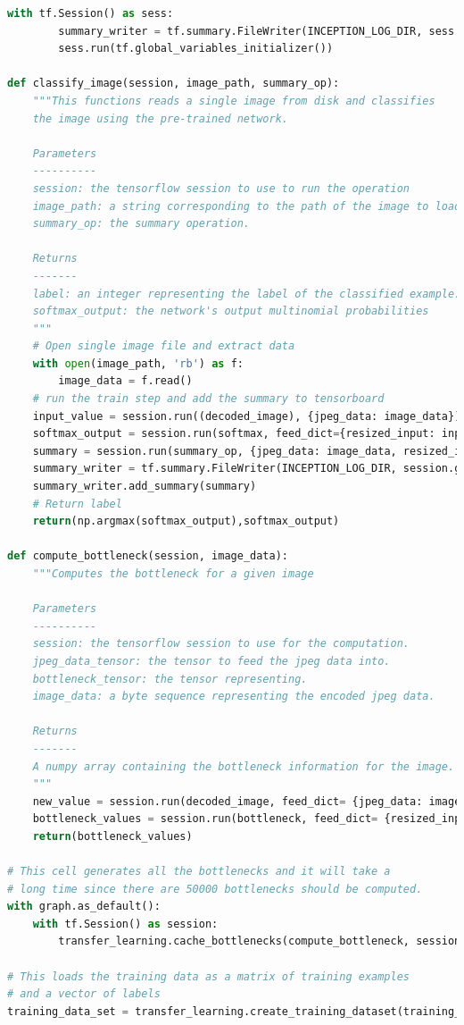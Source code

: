 \documentclass[hyperref]{article}
\theoremstyle{nonumberplain}
\begin{document}
\begin{appendices}
\begin{lstlisting}[language=Python]
    with tf.Session() as sess:
        summary_writer = tf.summary.FileWriter(INCEPTION_LOG_DIR, sess.graph)
        sess.run(tf.global_variables_initializer())

def classify_image(session, image_path, summary_op):
    """This functions reads a single image from disk and classifies
    the image using the pre-trained network.

    Parameters
    ----------
    session: the tensorflow session to use to run the operation
    image_path: a string corresponding to the path of the image to load
    summary_op: the summary operation.

    Returns
    -------
    label: an integer representing the label of the classified example.
    softmax_output: the network's output multinomial probabilities
    """
    # Open single image file and extract data
    with open(image_path, 'rb') as f:
        image_data = f.read()
    # run the train step and add the summary to tensorboard
    input_value = session.run((decoded_image), {jpeg_data: image_data})
    softmax_output = session.run(softmax, feed_dict={resized_input: input_value})
    summary = session.run(summary_op, {jpeg_data: image_data, resized_input: input_value})
    summary_writer = tf.summary.FileWriter(INCEPTION_LOG_DIR, session.graph)
    summary_writer.add_summary(summary)
    # Return label
    return(np.argmax(softmax_output),softmax_output)

def compute_bottleneck(session, image_data):
    """Computes the bottleneck for a given image

    Parameters
    ----------
    session: the tensorflow session to use for the computation.
    jpeg_data_tensor: the tensor to feed the jpeg data into.
    bottleneck_tensor: the tensor representing.
    image_data: a byte sequence representing the encoded jpeg data.

    Returns
    -------
    A numpy array containing the bottleneck information for the image.
    """
    new_value = session.run(decoded_image, feed_dict= {jpeg_data: image_data})
    bottleneck_values = session.run(bottleneck, feed_dict= {resized_input: new_value})
    return(bottleneck_values)

# This cell generates all the bottlenecks and it will take a
# long time since there are 50000 bottlenecks should be computed.
with graph.as_default():
    with tf.Session() as session:
        transfer_learning.cache_bottlenecks(compute_bottleneck, session, training_images)

# This loads the training data as a matrix of training examples
# and a vector of labels
training_data_set = transfer_learning.create_training_dataset(training_images)


\end{lstlisting}
\end{appendices}
\end{document}
